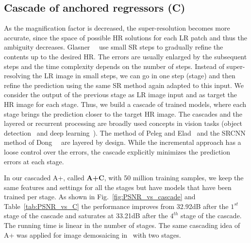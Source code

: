 \documentclass[10pt,twocolumn,letterpaper]{article}
\begin{document}
\subsection{Cascade of anchored regressors (C)}
\label{ssc:cascade}
As the magnification factor is decreased, the super-resolution becomes more accurate, since the space of possible HR solutions for each LR patch and thus the ambiguity decreases.
Glasner~\etal~\cite{Glasner-ICCV-2009} use small SR steps to gradually refine the contents up to the desired HR. The errors are usually enlarged by the subsequent steps and the time complexity depends on the number of steps.
Instead of super-resolving the LR image in small steps, we can go in one step (stage) and then refine the prediction using the same SR method again adapted to this input. We consider the output of the previous stage as LR image input and as target the HR image for each stage.
Thus, we build a cascade of trained models, where each stage brings the prediction closer to the target HR image. The cascades and the layered or recurrent processing are broadly used concepts in vision tasks (\ie object detection~\cite{Viola-CVPR-2001} and deep learning~\cite{Chatfield-BMVC-2014}). The method of Peleg and Elad~\cite{Peleg-TIP-2014} and the SRCNN method of Dong~\etal~\cite{Dong-ECCV-2014} are layered by design.
While the incremental approach has a loose control over the errors, the cascade explicitly minimizes the prediction errors at each stage.

In our cascaded A+, called \textbf{A+C}, with 50 million training samples, we keep the same features and settings for all the stages but have models that have been trained per stage.
As shown in Fig.~\ref{fig:PSNR_vs_cascade} and Table~\ref{tab:PSNR_vs_C} the performance improves from 32.92dB after the $1^{st}$ stage of the cascade and saturates at 33.21dB after the $4^{th}$ stage of the cascade. The running time is linear in the number of stages.
The same cascading idea of A+ was applied for image demosaicing in~\cite{Wu-ICIP-2015} with two stages.
\end{document}
